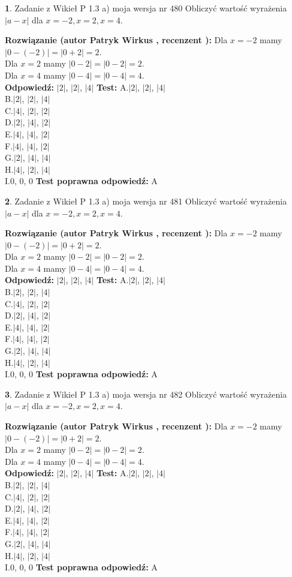 \documentclass[12pt, a4paper]{article}
\theoremstyle{definition} %
\newtheorem{zad}{}
\newcommand{\zadStart}[1]{\begin{zad}#1\newline}
\newcommand{\zadStop}{\end{zad}}
\newcommand{\rozwStart}[2]{\noindent \textbf{Rozwiązanie (autor #1 , recenzent #2): }\newline}
\newcommand{\rozwStop}{\newline}
\newcommand{\odpStart}{\noindent \textbf{Odpowiedź:}\newline}
\newcommand{\odpStop}{\newline}
\newcommand{\testStart}{\noindent \textbf{Test:}\newline}
\newcommand{\testStop}{\newline}
\newcommand{\kluczStart}{\noindent \textbf{Test poprawna odpowiedź:}\newline}
\newcommand{\kluczStop}{\newline}
\begin{document}
\zadStart{Zadanie z Wikieł P 1.3 a) moja wersja nr 480}
Obliczyć wartość wyrażenia $|a - x|$ dla $x=-2,x=2,x=4$.
\zadStop
\rozwStart{Patryk Wirkus}{}
Dla $x = -2$ mamy $|0 - (-2)| = |0 + 2| = 2$.\\
Dla $x = 2$ mamy $|0 - 2| = |0 - 2| = 2$.\\
Dla $x = 4$ mamy $|0 - 4| = |0 - 4| = 4$.\\
\rozwStop
\odpStart
$|2|$, $|2|$, $|4|$
\odpStop
\testStart
A.$|2|$, $|2|$, $|4|$\\
B.$|2|$, $|2|$, $|4|$\\
C.$|4|$, $|2|$, $|2|$\\
D.$|2|$, $|4|$, $|2|$\\
E.$|4|$, $|4|$, $|2|$\\
F.$|4|$, $|4|$, $|2|$\\
G.$|2|$, $|4|$, $|4|$\\
H.$|4|$, $|2|$, $|4|$\\
I.$0$, $0$, $0$
\testStop
\kluczStart
A
\kluczStop



\zadStart{Zadanie z Wikieł P 1.3 a) moja wersja nr 481}
Obliczyć wartość wyrażenia $|a - x|$ dla $x=-2,x=2,x=4$.
\zadStop
\rozwStart{Patryk Wirkus}{}
Dla $x = -2$ mamy $|0 - (-2)| = |0 + 2| = 2$.\\
Dla $x = 2$ mamy $|0 - 2| = |0 - 2| = 2$.\\
Dla $x = 4$ mamy $|0 - 4| = |0 - 4| = 4$.\\
\rozwStop
\odpStart
$|2|$, $|2|$, $|4|$
\odpStop
\testStart
A.$|2|$, $|2|$, $|4|$\\
B.$|2|$, $|2|$, $|4|$\\
C.$|4|$, $|2|$, $|2|$\\
D.$|2|$, $|4|$, $|2|$\\
E.$|4|$, $|4|$, $|2|$\\
F.$|4|$, $|4|$, $|2|$\\
G.$|2|$, $|4|$, $|4|$\\
H.$|4|$, $|2|$, $|4|$\\
I.$0$, $0$, $0$
\testStop
\kluczStart
A
\kluczStop



\zadStart{Zadanie z Wikieł P 1.3 a) moja wersja nr 482}
Obliczyć wartość wyrażenia $|a - x|$ dla $x=-2,x=2,x=4$.
\zadStop
\rozwStart{Patryk Wirkus}{}
Dla $x = -2$ mamy $|0 - (-2)| = |0 + 2| = 2$.\\
Dla $x = 2$ mamy $|0 - 2| = |0 - 2| = 2$.\\
Dla $x = 4$ mamy $|0 - 4| = |0 - 4| = 4$.\\
\rozwStop
\odpStart
$|2|$, $|2|$, $|4|$
\odpStop
\testStart
A.$|2|$, $|2|$, $|4|$\\
B.$|2|$, $|2|$, $|4|$\\
C.$|4|$, $|2|$, $|2|$\\
D.$|2|$, $|4|$, $|2|$\\
E.$|4|$, $|4|$, $|2|$\\
F.$|4|$, $|4|$, $|2|$\\
G.$|2|$, $|4|$, $|4|$\\
H.$|4|$, $|2|$, $|4|$\\
I.$0$, $0$, $0$
\testStop
\kluczStart
A
\kluczStop
\end{document}
